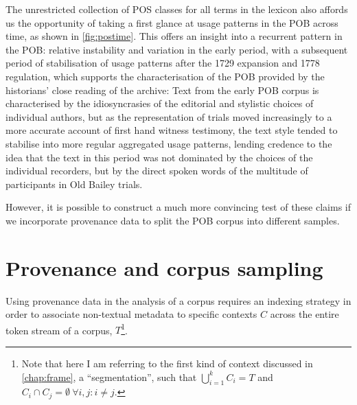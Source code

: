 The unrestricted collection of POS classes for all terms in the lexicon also affords us the opportunity of taking a first glance at usage patterns in the POB across time, as shown in \autoref{fig:postime}.
This offers an insight into a recurrent pattern in the POB: relative instability and variation in the early period, with a subsequent period of stabilisation of usage patterns after the 1729 expansion and 1778 regulation, which supports the characterisation of the POB provided by the historians' close reading of the archive:
Text from the early POB corpus is characterised by the idiosyncrasies of the editorial and stylistic choices of individual authors, but as the representation of trials moved increasingly to a more accurate account of first hand witness testimony, the text style tended to stabilise into more regular aggregated usage patterns, lending credence to the idea that the text in this period was not dominated by the choices of the individual recorders, but by the direct spoken words of the multitude of participants in Old Bailey trials.

However, it is possible to construct a much more convincing test of these claims if we incorporate provenance data to split the POB corpus into different samples.

\section{Provenance and corpus sampling}
\label{sec:docsampling}

Using provenance data in the analysis of a corpus requires an indexing strategy in order to associate non-textual metadata to specific contexts $C$ across the entire token stream of a corpus, $T$\footnote{
    \label{foot:segment}
    Note that here I am referring to the first kind of context discussed in \autoref{chap:frame}, a ``segmentation'', such that $\bigcup_{i=1}^k C_{i} = T$ and $ C_i \cap C_j = \emptyset\ \forall i,j : i \neq j$.
}.

